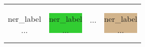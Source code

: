 \documentclass[landscape,footrule]{foils}
\begin{document}
\begin{triangles}
\begin{minipage}{10cm}
\begin{triangles}
\begin{triangles}
\begin{tabular}{cccc}
{\begin{minipage}{3.75cm}
 \begin{diamonds}
 \item ner\_label
 \item $\ldots$\vspace*{1ex}
 \end{diamonds}
 \end{minipage}}
 &
 \colorbox{LimeGreen}{
 \begin{minipage}{3.75cm}
 \begin{diamonds}
 \item ner\_label
 \item $\ldots$\vspace*{1ex}
 \end{diamonds} 
 \end{minipage}}
 & 
 $\cdots$
 &
 \colorbox{Tan}{
 \begin{minipage}{3.75cm}
 \begin{diamonds}
 \item ner\_label
 \item $\ldots$\vspace*{1ex}
 \end{diamonds} 
 \end{minipage}}

\end{tabular}

\end{triangles}
\end{triangles}
\end{minipage}

\end{triangles}
\end{document}

